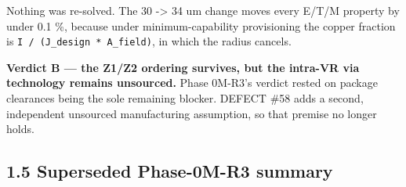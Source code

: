 \documentclass[10pt,]{article}
\begin{document}
Nothing was re-solved. The 30 -\textgreater{} 34 um change moves every
E/T/M property by under 0.1 \%, because under minimum-capability
provisioning the copper fraction is
\texttt{I\ /\ (J\_design\ *\ A\_field)}, in which the radius cancels.

\textbf{Verdict B --- the Z1/Z2 ordering survives, but the intra-VR via
technology remains unsourced.} Phase 0M-R3's verdict rested on package
clearances being the sole remaining blocker. DEFECT \#58 adds a second,
independent unsourced manufacturing assumption, so that premise no
longer holds.

\newpage

\hypertarget{superseded-phase-0m-r3-summary}{%
\subsection{1.5 Superseded Phase-0M-R3
summary}\label{superseded-phase-0m-r3-summary}}
\end{document}
